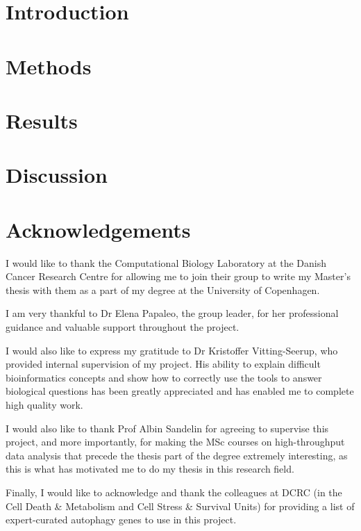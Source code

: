 \documentclass[10pt, openright,oneside]{book}
\begin{document}
\chapter{Introduction}


\chapter{Methods}


\chapter{Results}


\chapter{Discussion}




\cleardoublepage
{}
\chapter*{Acknowledgements}

I would like to thank the Computational Biology Laboratory at the Danish Cancer Research Centre for allowing me to join their group to write my Master’s thesis with them as a part of my degree at the University of Copenhagen.  

I am very thankful to Dr Elena Papaleo, the group leader, for her professional guidance and valuable support throughout the project. 

I would also like to express my gratitude to Dr Kristoffer Vitting-Seerup, who provided internal supervision of my project. His ability to explain difficult bioinformatics concepts and show how to correctly use the tools to answer biological questions has been greatly appreciated and has enabled me to complete high quality work.

I would also like to thank Prof Albin Sandelin for agreeing to supervise this project, and more importantly, for making the MSc courses on high-throughput data analysis that precede the thesis part of the degree extremely interesting,  as this is what has motivated me to do my thesis in this research field. 

Finally, I would like to acknowledge and thank the colleagues at DCRC (in the Cell Death \& Metabolism and Cell Stress \& Survival Units)  for providing a list of expert-curated autophagy genes to use in this project.
\end{document}
